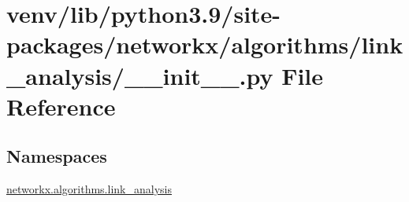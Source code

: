 \hypertarget{venv_2lib_2python3_89_2site-packages_2networkx_2algorithms_2link__analysis_2____init_____8py}{}\section{venv/lib/python3.9/site-\/packages/networkx/algorithms/link\+\_\+analysis/\+\_\+\+\_\+init\+\_\+\+\_\+.py File Reference}
\label{venv_2lib_2python3_89_2site-packages_2networkx_2algorithms_2link__analysis_2____init_____8py}
\subsection*{Namespaces}
\begin{DoxyCompactItemize}
\item 
 \hyperlink{namespacenetworkx_1_1algorithms_1_1link__analysis}{networkx.\+algorithms.\+link\+\_\+analysis}
\end{DoxyCompactItemize}
